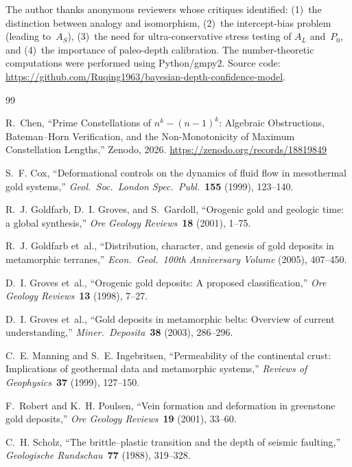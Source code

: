 \documentclass[11pt,a4paper]{article}
\begin{document}
The author thanks anonymous reviewers whose critiques identified:
(1)~the distinction between analogy and isomorphism,
(2)~the intercept-bias problem (leading to~$A_S$),
(3)~the need for ultra-conservative stress testing of $A_L$ and~$P_0$,
and (4)~the importance of paleo-depth calibration.
The number-theoretic computations were performed using Python/gmpy2.
Source code: \url{https://github.com/Ruqing1963/bayesian-depth-confidence-model}.

\begin{thebibliography}{99}

R.~Chen, ``Prime Constellations of $n^k - (n-1)^k$: Algebraic Obstructions, Bateman--Horn Verification, and the Non-Monotonicity of Maximum Constellation Lengths,'' Zenodo, 2026.
\url{https://zenodo.org/records/18819849}

S.~F. Cox, ``Deformational controls on the dynamics of fluid flow in mesothermal gold systems,''
\textit{Geol.\ Soc.\ London Spec.\ Publ.}\ \textbf{155} (1999), 123--140.

R.~J. Goldfarb, D.~I. Groves, and S.~Gardoll, ``Orogenic gold and geologic time: a global synthesis,''
\textit{Ore Geology Reviews}\ \textbf{18} (2001), 1--75.

R.~J. Goldfarb et~al., ``Distribution, character, and genesis of gold deposits in metamorphic terranes,''
\textit{Econ.\ Geol.\ 100th Anniversary Volume} (2005), 407--450.

D.~I. Groves et~al., ``Orogenic gold deposits: A proposed classification,''
\textit{Ore Geology Reviews}\ \textbf{13} (1998), 7--27.

D.~I. Groves et~al., ``Gold deposits in metamorphic belts: Overview of current understanding,''
\textit{Miner.\ Deposita}\ \textbf{38} (2003), 286--296.

C.~E. Manning and S.~E. Ingebritsen, ``Permeability of the continental crust: Implications of geothermal data and metamorphic systems,''
\textit{Reviews of Geophysics}\ \textbf{37} (1999), 127--150.

F.~Robert and K.~H. Poulsen, ``Vein formation and deformation in greenstone gold deposits,''
\textit{Ore Geology Reviews}\ \textbf{19} (2001), 33--60.

C.~H. Scholz, ``The brittle--plastic transition and the depth of seismic faulting,''
\textit{Geologische Rundschau}\ \textbf{77} (1988), 319--328.


\end{thebibliography}
\end{document}
